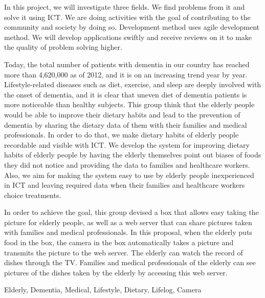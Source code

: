 \documentclass[../report]{subfiles}
\begin{document}
\begin{eabstract}
In this project, we will investigate three fields.
We find problems from it and solve it using ICT.
We are doing activities with the goal of contributing to the community and society by doing so.
Development method uses agile development method.
We will develop applications swiftly and receive reviews on it to make the quality of problem solving higher.

Today, the total number of patients with dementia in our country has reached more than 4,620,000 as of 2012, and it is on an increasing trend year by year.
Lifestyle-related diseases such as diet, exercise, and sleep are deeply involved with the onset of dementia, and it is clear that uneven diet of dementia patients is more noticeable than healthy subjects.
This group think that the elderly people would be able to improve their dietary habits and lead to the prevention of dementia by sharing the dietary data of them with their families and medical professionals.
In order to do that, we make dietary habits of elderly people recordable and visible with ICT.
We develop the system for improving dietary habits of elderly people by having the elderly themselves point out biases of foods they did not notice and providing the data to families and healthcare workers.
Also, we aim for making the system easy to use by elderly people inexperienced in ICT and leaving required data when their families and healthcare workers choice treatments.

In order to achieve the goal, this group devised a box that allows easy taking the picture for elderly people, as well as a web server that can share pictures taken with families and medical professionals.
In this proposal, when the elderly puts food in the box, the camera in the box automatically takes a picture and transmits the picture to the web server.
The elderly can watch the record of dishes through the TV.
Families and medical professionals of the elderly can see pictures of the dishes taken by the elderly by accessing this web server.
\begin{ekeyword}
Elderly, Dementia, Medical, Lifestyle, Dietary, Lifelog, Camera
\end{ekeyword}
\end{eabstract}
\end{document}
